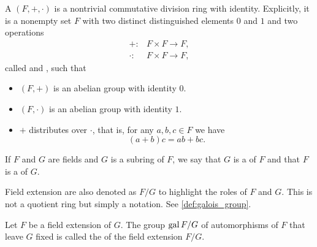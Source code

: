 \begin{definition}\label{def:field}\cite[142]{Knapp2016BAlg}
  A  \( (F, +, \cdot) \) is a nontrivial commutative division ring with identity. Explicitly, it is a nonempty set \( F \) with two distinct distinguished elements \( 0 \) and \( 1 \) and two operations
  \begin{align*}
    +: &F \times F \to F, \\
    \cdot: &F \times F \to F,
  \end{align*}
  called  and , such that
  \begin{itemize}
    \item \( (F, +) \) is an abelian group with identity \( 0 \).
    \item \( (F, \cdot) \) is an abelian group with identity \( 1 \).
    \item \( + \) distributes over \( \cdot \), that is, for any \( a, b, c \in F \) we have
    \begin{equation*}
      (a + b)c = ab + bc.
    \end{equation*}
  \end{itemize}
\end{definition}

\begin{definition}\label{def:field_extension}
  If \( F \) and \( G \) are fields and \( G \) is a subring of \( F \), we say that \( G \) is a  of \( F \) and that \( F \) is a  of \( G \).

  Field extension are also denoted as \( F / G \) to highlight the roles of \( F \) and \( G \). This is not a quotient ring but simply a notation. See \cref{def:galois_group}.
\end{definition}

\begin{definition}\label{def:galois_group}\cite[124]{Knapp2016BAlg}
  Let \( F \) be a field extension of \( G \). The group \( \operatorname{gal}{F / G} \) of automorphisms of \( F \) that leave \( G \) fixed is called the  of the field extension \( F / G \).
\end{definition}

